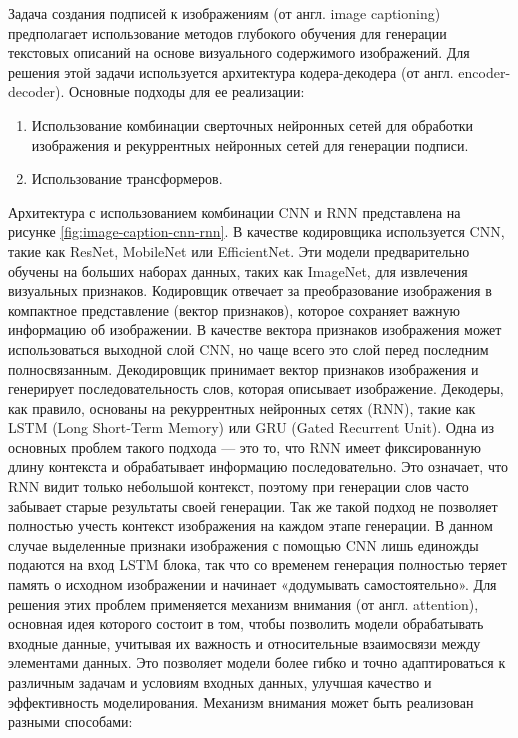 \documentclass[a4paper,12pt]{extarticle}
\begin{document}
Задача создания подписей к изображениям (от англ. image captioning) предполагает использование методов глубокого обучения для генерации текстовых описаний на основе визуального содержимого изображений. Для решения этой задачи используется архитектура кодера-декодера (от англ. encoder-decoder). Основные подходы для ее реализации:
\begin{enumerate}[label=\arabic*.]
	\item Использование комбинации сверточных нейронных сетей для обработки изображения и рекуррентных нейронных сетей для генерации подписи. 
	\item Использование трансформеров. 
\end{enumerate}

Архитектура с использованием комбинации CNN и RNN представлена на рисунке \ref{fig:image-caption-cnn-rnn}. В качестве кодировщика используется CNN, такие как ResNet, MobileNet или EfficientNet. Эти модели предварительно обучены на больших наборах данных, таких как ImageNet, для извлечения визуальных признаков. Кодировщик отвечает за преобразование изображения в компактное представление (вектор признаков), которое сохраняет важную информацию об изображении. В качестве вектора признаков изображения может использоваться выходной слой CNN, но чаще всего это слой перед последним полносвязанным. Декодировщик принимает вектор признаков изображения и генерирует последовательность слов, которая описывает изображение. Декодеры, как правило, основаны на рекуррентных нейронных сетях (RNN), такие как LSTM (Long Short-Term Memory) или GRU (Gated Recurrent Unit). Одна из основных проблем такого подхода — это то, что RNN имеет фиксированную длину контекста и обрабатывает информацию последовательно. Это означает, что RNN видит только небольшой контекст, поэтому при генерации слов часто забывает старые результаты своей генерации. Так же такой подход не позволяет полностью учесть контекст изображения на каждом этапе генерации. В данном случае выделенные признаки изображения с помощью CNN лишь единожды подаются на вход LSTM блока, так что со временем генерация полностью теряет память о исходном изображении и начинает «додумывать самостоятельно». Для решения этих проблем применяется механизм внимания (от англ. attention)\cite{attention}, основная идея которого состоит в том, чтобы позволить модели обрабатывать входные данные, учитывая их важность и относительные взаимосвязи между элементами данных. Это позволяет модели более гибко и точно адаптироваться к различным задачам и условиям входных данных, улучшая качество и эффективность моделирования. Механизм внимания может быть реализован разными способами:
\end{document}
